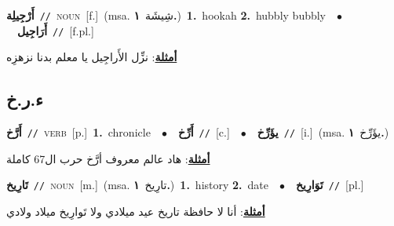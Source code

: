 \documentclass[10pt,a4paper,twoside]{article} %
\begin{document}
\begin{multicols}{2}
{\setlength\topsep{0pt}\textbf{\foreignlanguage{arabic}{أَرْجِيلِة}}\ {\color{gray}\texttt{//}\color{black}}\ \textsc{noun}\ [f.]\ \color{gray}(msa. \foreignlanguage{arabic}{شِيشَة}~\foreignlanguage{arabic}{\textbf{١.}})\color{black}\ \textbf{1.}~hookah  \textbf{2.}~hubbly bubbly\ \ $\bullet$\ \ \setlength\topsep{0pt}\textbf{\foreignlanguage{arabic}{أَرَاجِيل}}\ {\color{gray}\texttt{//}\color{black}}\ [f.pl.]\  \begin{flushright}\color{gray}\foreignlanguage{arabic}{\textbf{\underline{\foreignlanguage{arabic}{أمثلة}}}: نزِّل الأَراجِيل يا معلم بدنا نزهزِه}\end{flushright}\color{black}} \vspace{2mm}

\vspace{-3mm}
\subsection*{\color{blue}\foreignlanguage{arabic}{ء.ر.خ}\color{blue}{}} 

{\setlength\topsep{0pt}\textbf{\foreignlanguage{arabic}{أَرَّخ}}\ {\color{gray}\texttt{//}\color{black}}\ \textsc{verb}\ [p.]\ \textbf{1.}~chronicle\ \ $\bullet$\ \ \setlength\topsep{0pt}\textbf{\foreignlanguage{arabic}{أَرِّخ}}\ {\color{gray}\texttt{//}\color{black}}\ [c.]\ \ $\bullet$\ \ \setlength\topsep{0pt}\textbf{\foreignlanguage{arabic}{يؤَرِّخ}}\ {\color{gray}\texttt{//}\color{black}}\ [i.]\ \color{gray}(msa. \foreignlanguage{arabic}{يؤَرِّخ}~\foreignlanguage{arabic}{\textbf{١.}})\color{black}\  \begin{flushright}\color{gray}\foreignlanguage{arabic}{\textbf{\underline{\foreignlanguage{arabic}{أمثلة}}}: هاد عالم معروف أرَّخ حرب ال67 كاملة}\end{flushright}\color{black}} \vspace{2mm}

{\setlength\topsep{0pt}\textbf{\foreignlanguage{arabic}{تَارِيخ}}\ {\color{gray}\texttt{//}\color{black}}\ \textsc{noun}\ [m.]\ \color{gray}(msa. \foreignlanguage{arabic}{تارِيخ}~\foreignlanguage{arabic}{\textbf{١.}})\color{black}\ \textbf{1.}~history  \textbf{2.}~date\ \ $\bullet$\ \ \setlength\topsep{0pt}\textbf{\foreignlanguage{arabic}{تَوَارِيخ}}\ {\color{gray}\texttt{//}\color{black}}\ [pl.]\  \begin{flushright}\color{gray}\foreignlanguage{arabic}{\textbf{\underline{\foreignlanguage{arabic}{أمثلة}}}: أنا لا حافظة تاريخ عيد ميلادي ولا تَوارِيخ ميلاد ولادي}\end{flushright}\color{black}} \vspace{2mm}


\end{multicols}
\end{document}
